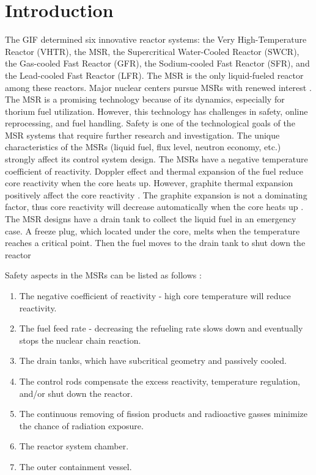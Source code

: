 \section{Introduction} \label{Introduction}

The \gls{GIF} \cite{doe2002technology} determined six innovative reactor systems: the Very High-Temperature Reactor (VHTR), the \gls{MSR}, the Supercritical Water-Cooled Reactor (SWCR), the Gas-cooled Fast Reactor (GFR), the Sodium-cooled Fast Reactor (SFR), and the Lead-cooled Fast Reactor (LFR). The MSR is the only liquid-fueled reactor among these reactors. Major nuclear centers pursue MSRs with renewed interest \cite{betzler_impacts_2019,ashraf2019whole_core,betzler2016modeling,mohsin2019safety,zhang2020radiotoxicity}. The MSR is a promising technology because of its dynamics, especially for thorium fuel utilization. However, this technology has challenges in safety, online reprocessing, and fuel handling. Safety is one of the technological goals of the MSR systems that require further research and investigation. The unique characteristics of the MSRs (liquid fuel, flux level, neutron economy, etc.) strongly affect its control system design. The MSRs have a negative temperature coefficient of reactivity. Doppler effect and thermal expansion of the fuel reduce core reactivity when the core heats up. However, graphite thermal expansion positively affect the core reactivity \cite{mathieu2006thorium}. The graphite expansion is not a dominating factor, thus core reactivity will decrease automatically when the core heats up \cite{li_optimization_2018}. The MSR designs have a drain tank to collect the liquid fuel in an emergency case. A freeze plug, which located under the core, melts when the temperature reaches a critical point. Then the fuel moves to the drain tank to shut down the reactor \cite{elsheikh2013safety}

Safety aspects in the MSRs can be listed as follows \cite{elsheikh2013safety,merle2008optimization}:
\begin{enumerate}
\item The negative coefficient of reactivity - high core temperature will reduce reactivity.
\item The fuel feed rate - decreasing the refueling rate slows down and eventually stops the nuclear chain reaction.
\item The drain tanks, which have subcritical geometry and passively cooled.
\item The control rods compensate the excess reactivity, temperature regulation, and/or shut down the reactor.
\item The continuous removing of fission products and radioactive gasses minimize the chance of radiation exposure.
\item The reactor system chamber.
\item The outer containment vessel.
\end{enumerate}

